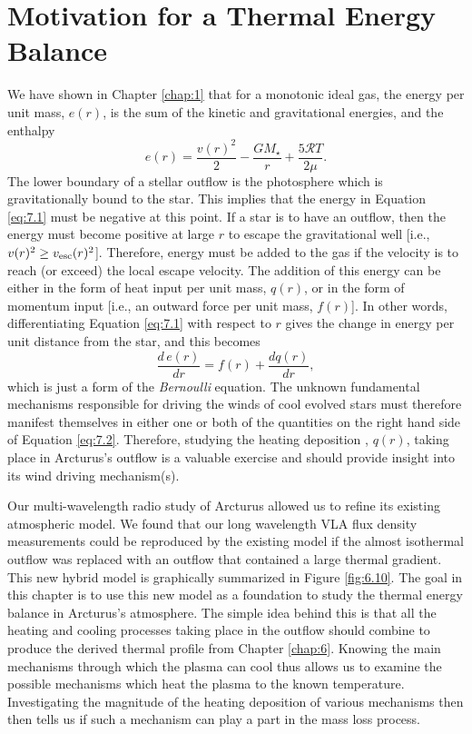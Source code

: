 \section{Motivation for a Thermal Energy Balance}\label{sec:7.1}
We have shown in Chapter \ref{chap:1} that for a monotonic ideal gas, the energy per unit mass, $e(r)$, is the sum of the kinetic and gravitational energies, and the enthalpy
\begin{equation}
\label{eq:7.1}
e(r)=\frac{v(r)^2}{2}-\frac{GM_{\star}}{r}+\frac{5\mathcal{R}T}{2\mu}.
\end{equation}
The lower boundary of a stellar outflow is the photosphere which is gravitationally bound to the star. This implies that the energy in Equation \ref{eq:7.1} must be negative at this point. If a star is to have an outflow, then the energy must become positive at large $r$ to escape the gravitational well [i.e., $v(r)^2 \geq v_{\rm{esc}}(r)^2$]. Therefore, energy must be added to the gas if the velocity is to reach (or exceed) the local escape velocity. The addition of this energy can be either in the form of heat input per unit mass, $q(r)$, or in the form of momentum input [i.e., an outward force per unit mass, $f(r)$]. In other words, differentiating Equation \ref{eq:7.1} with respect to $r$ gives the change in energy per unit distance from the star, and this becomes
\begin{equation}
\label{eq:7.2}
\frac{d\,e(r)}{dr}=f(r)+\frac{dq(r)}{dr},
\end{equation}
which is just a form of the \textit{Bernoulli} equation. The unknown fundamental mechanisms responsible for driving the winds of cool evolved stars must therefore manifest themselves in either one or both of the quantities on the right hand side of Equation \ref{eq:7.2}. Therefore, studying the heating deposition , $q(r)$, taking place in Arcturus's outflow is a valuable exercise and should provide insight into its wind driving mechanism(s).

Our multi-wavelength radio study of Arcturus allowed us to refine its existing atmospheric model. We found that our long wavelength VLA flux density measurements could be reproduced by the existing model if the almost isothermal outflow was replaced with an outflow that contained a large thermal gradient. This new hybrid model is graphically summarized in Figure \ref{fig:6.10}. The goal in this chapter is to use this new model as a foundation to study the thermal energy balance in Arcturus's atmosphere. The simple idea behind this is that all the heating and cooling processes taking place in the outflow should combine to produce the derived thermal profile from Chapter \ref{chap:6}. Knowing the main mechanisms through which the plasma can cool thus allows us to examine the possible mechanisms which heat the plasma to the known temperature. Investigating the magnitude of the heating deposition of various mechanisms then then tells us if such a mechanism can play a part in the mass loss process.

